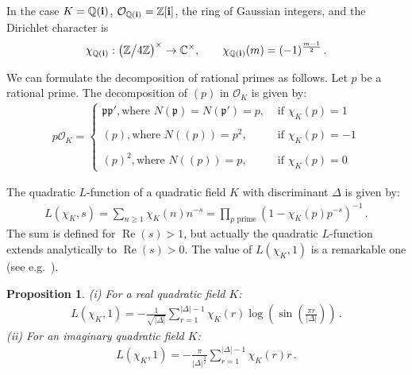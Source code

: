 \documentclass[reqno]{amsart}
\theoremstyle{plain}
\newtheorem{proposition}[theorem]{Proposition}
\theoremstyle{definition}
\theoremstyle{remark}
\numberwithin{equation}{section}
\begin{document}
In the case $K={{\mathbb Q}}({{\bf i}})$, ${{\mathcal O}}_{{{\mathbb Q}}({{\bf i}})} = {{\mathbb Z}}[{{\bf i}}]$, the ring of
Gaussian integers, and the Dirichlet character is
\begin{align*}
  \chi_{{{\mathbb Q}}({{\bf i}})}:\left({{\mathbb Z}}\big/4{{\mathbb Z}}\right)^\times\to{{\mathbb C}}^\times,\qquad
  \chi_{{{\mathbb Q}}({{\bf i}})}(m) = (-1)^{\frac{m-1}{2}}\,.
\end{align*}

We can formulate the decomposition of rational primes as follows. Let
$p$ be a rational prime. The decomposition of $(p)$ in ${{\mathcal O}}_K$ is
given by:
\begin{align*}
  p{{\mathcal O}}_K = \left\{
  \begin{array}{ll}
    \mathfrak{p} \mathfrak{p}', \text{where }N(\mathfrak{p})=N(\mathfrak{p}')=p, &
                                 \text{ if } \chi_K(p)=1\\
    \,\\
    (p), \text{where }N((p))=p^2,  & \text{ if } \chi_K(p)=-1\\
    \,\\
    (p)^2, \text{where }N((p))=p,  & \text{ if } \chi_K(p)=0
  \end{array}\right.
\end{align*}

The quadratic $L$-function of a quadratic field $K$ with discriminant
$\Delta$ is given by:
\begin{align*}
  L(\chi_K,s) = \sum_{n\geq 1} \chi_K(n) n^{-s}
  = \prod_{p\text{ prime}} \left(1-\chi_K(p)p^{-s}\right)^{-1}\,.
\end{align*}
The sum is defined for ${{\operatorname{Re}}}(s)> 1$, but actually the quadratic
$L$-function extends analytically to ${{\operatorname{Re}}}(s)>0$. The value of
$L(\chi_K,1)$ is a remarkable one (see
e.g.~\cite{cohen,ireland,lang}).
\begin{proposition}
  (i) For a real quadratic field $K$:
  \begin{align*}
    L(\chi_K,1) = -\frac{1}{\sqrt{|\Delta|}} \sum_{r=1}^{|\Delta|-1}
    \chi_K(r)\log\left(\sin\left(\frac{\pi r}{|\Delta|}\right)\right)\,.
  \end{align*}
  (ii) For an imaginary quadratic field $K$:
  \begin{align*}
    L(\chi_K,1) = -\frac{\pi}{|\Delta|^{\frac32}} \sum_{r=1}^{|\Delta|-1}
    \chi_K(r) r\,.
  \end{align*}
\end{proposition}
\end{document}

